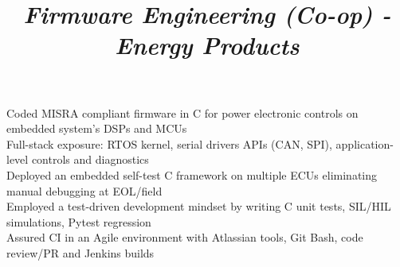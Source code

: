 \documentclass[mm]{res}
\begin{document}
\begin{resume}
\title{\textsl{Firmware Engineering (Co-op) - Energy Products}}
\begin{position}
\tb Coded MISRA compliant firmware in C for power electronic controls on embedded system's DSPs and MCUs\\
\tb Full-stack exposure: RTOS kernel, serial drivers APIs (CAN, SPI), application-level controls and diagnostics\\
\tb Deployed an embedded self-test C framework on multiple ECUs eliminating manual debugging at EOL/field\\
\tb Employed a test-driven development mindset by writing C unit tests, SIL/HIL simulations, Pytest regression \\
\tb Assured CI in an Agile environment with Atlassian tools, Git Bash, code review/PR and Jenkins builds
\end{position}


\end{resume}
\end{document}
